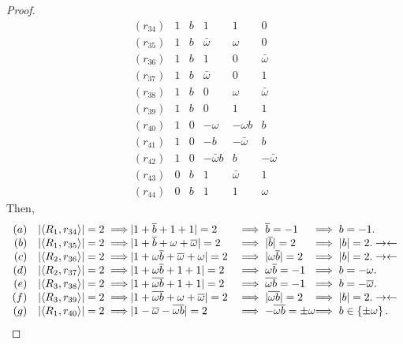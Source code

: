 \begin{lemma}
\begin{proof}
     $$
     \begin{array}{rccccc}
	(r_{34})  & 1 & b         & 1         & 1         & 0 \\
	(r_{35})  & 1 & b         & \bar{\omega}   & \omega        & 0 \\
	(r_{36})  & 1 & b         & 1         & 0         & \bar{\omega} \\
	(r_{37})  & 1 & b         & \bar{\omega}   & 0         & 1 \\
	(r_{38})  & 1 & b         & 0         & \omega        & \bar{\omega} \\
	(r_{39})  & 1 & b         & 0         & 1         & 1 \\
	(r_{40})  & 1 & 0         & -\omega        & -\omega b       & b \\
	(r_{41})  & 1 & 0         & -b        & -\bar{\omega}  & b \\
	(r_{42})  & 1 & 0         & -\bar{\omega}b & b         & -\bar{\omega} \\
	(r_{43})  & 0 & b         & 1         & \bar{\omega}   & 1 \\
	(r_{44})  & 0 & b         & 1         & 1         & \omega 
     \end{array}
     $$
Then,
     $$
     \begin{array}{rc@{\hspace{-0.02cm}}ll@{\hspace{-0.1cm}}l}
      (a) & \unb1{34} \implies & |1+\bar{b}+1+1|=2             &\implies \bar{b}=-1             &\implies b = -1.          \\
      (b) & \unb1{35} \implies & |1+\bar{b}+\omega+\bar{\omega}|=2       &\implies |\bar{b}|=2            &\implies |b| = 2.   \con \\
      (c) & \unb2{36} \implies & |1+\omega\bar{b}+\bar{\omega}+\omega|=2      &\implies |\omega\bar{b}|=2           &\implies |b| = 2.   \con \\
      (d) & \unb2{37} \implies & |1+\omega\bar{b}+1+1|=2            &\implies \omega\bar{b}=-1            &\implies b = -\omega.          \\
      (e) & \unb3{38} \implies & |1+\overline{\omega b}+1+1|=2       &\implies \overline{\omega b}=-1       &\implies b = -\bar{\omega}.     \\
      (f) & \unb3{39} \implies & |1+\overline{\omega b}+\omega+\bar{\omega}|=2 &\implies |\overline{\omega b}|=2      &\implies |b| = 2.   \con \\
      (g) & \unb1{40} \implies & |1-\bar{\omega}-\overline{\omega b}|=2   &\implies -\overline{\omega b}=\pm\omega   &\implies b \in \left\{ \pm\omega\right\}.       \\

\end{array}$$
\end{proof}
\end{lemma}

